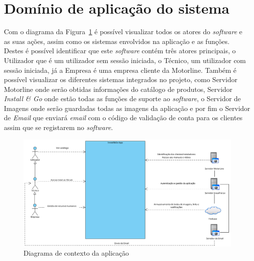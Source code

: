 \section{Domínio de aplicação do sistema}

Com o diagrama da Figura~\ref{fig:2} é possível visualizar todos os atores do \textit{software} e as suas ações, assim como os sistemas envolvidos na aplicação e as funções.
Destes é possível identificar que este \textit{software} contém três atores principais, o Utilizador que é um utilizador sem sessão iniciada, o Técnico, um utilizador com sessão iniciada, já a Empresa é uma empresa cliente da Motorline. Também é possível visualizar os diferentes sistemas integrados no projeto, como Servidor Motorline onde serão obtidas informações do catálogo de produtos, Servidor \textit{Install \& Go} onde estão todas as funções de suporte ao \textit{software}, o Servidor de Imagens onde serão guardadas todas as imagens da aplicação e por fim o Servidor de \textit{Email} que enviará \textit{email} com o código de validação de conta para os clientes assim que se registarem no \textit{software}.

\begin{figure}[htb]
  \centering
  
  \includegraphics[width=\textwidth]{images/diagramas/diagrama_contexto.png}
  \caption{Diagrama de contexto da aplicação}
  \label{fig:2}
\end{figure}